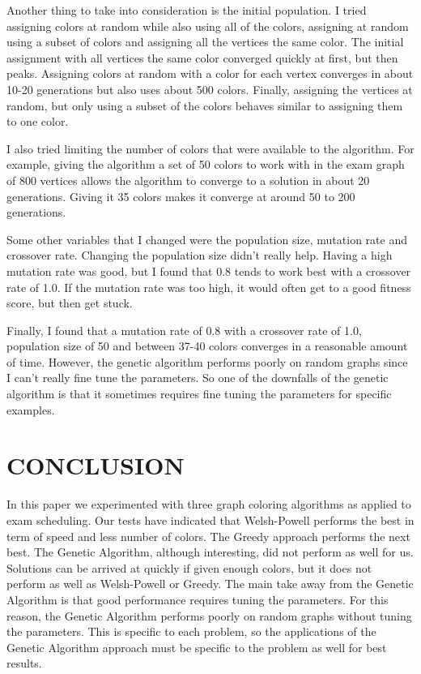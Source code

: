 \documentclass[12]{article}
\begin{document}
Another thing to take into consideration is the initial population. I tried assigning colors at random while also using all of the colors, assigning at random using a subset of colors and assigning all the vertices the same color. The initial assignment with all vertices the same color converged quickly at first, but then peaks. Assigning colors at random with a color for each vertex converges in about 10-20 generations but also uses about 500 colors. Finally, assigning the vertices at random, but only using a subset of the colors behaves similar to assigning them to one color.

I also  tried limiting the number of colors that were available to the algorithm. For example, giving the algorithm a set of 50 colors to work with in the exam graph of 800 vertices allows the algorithm to converge to a solution in about 20 generations. Giving it 35 colors makes it converge at around 50 to 200 generations.

Some other variables that I changed were the population size, mutation rate and crossover rate. Changing the population size didn't really help. Having a high mutation rate was good, but I found that 0.8 tends to work best with a crossover rate of 1.0. If the mutation rate was too high, it would often get to a good fitness score, but then get stuck.

Finally, I found that a mutation rate of 0.8 with a crossover rate of 1.0, population size of 50 and between 37-40 colors converges in a reasonable amount of time. However, the genetic algorithm performs poorly on random graphs since I can't really fine tune the parameters. So one of the downfalls of the genetic algorithm is that it sometimes requires fine tuning the parameters for specific examples.
\section{CONCLUSION}
In this paper we experimented with three graph coloring algorithms as applied to exam scheduling. Our tests have indicated that Welsh-Powell performs the best in term of speed and less number of colors. The Greedy approach performs  the next best. The Genetic Algorithm, although interesting, did not perform as well for us. Solutions can be arrived at quickly if given enough colors, but it does not perform as well as Welsh-Powell or Greedy. The main take away from the Genetic Algorithm is that good performance requires tuning the parameters. For this reason, the Genetic Algorithm performs poorly on random graphs without tuning the parameters. This is specific to each problem, so the applications of the Genetic Algorithm approach must be specific to the problem as well for best results. 
\end{document}
